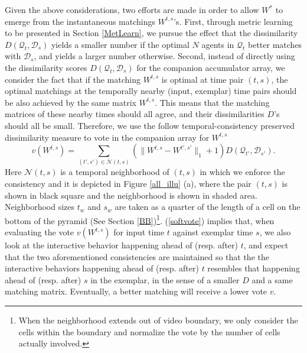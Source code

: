 Given the above considerations, two efforts are made in order to allow $W^{*}$ to emerge from the instantaneous matchings $W^{t,s}$'s. First, through metric learning to be presented in Section \ref{MetLearn}, we pursue the effect that the dissimilarity $D(\mathcal{Q}_{t}, \mathcal{D}_{s})$ yields a smaller number if the optimal $N$ agents in $\mathcal{Q}_{t}$ better matches with $\mathcal{D}_{s}$, and yields a larger number otherwise. Second, instead of directly using the dissimilarity scores $D(\mathcal{Q}_{t}, \mathcal{D}_{s})$ for the companion accumulator array, we consider the fact that if the matching $W^{t,s}$ is optimal at time pair $(t,s)$, the optimal matchings at the temporally nearby (input, exemplar) time pairs should be also achieved by the same matrix $W^{t,s}$. This means that the matching matrices of these nearby times should all agree, and their dissimilarities $D$'s should all be small. Therefore, we use the follow temporal-consistency preserved dissimilarity measure to vote in the companion array for $W^{t,s}$
\begin{equation}
\label{softvote}
v(W^{t,s})=\sum_{(t',s')\in\mathcal{N}(t,s)}(\|W^{t,s}-W^{t',s'}\|_{1}+1)D(\mathcal{Q}_{t'}, \mathcal{D}_{s'}).
\end{equation}
Here $\mathcal{N}(t,s)$ is a temporal neighborhood of $(t,s)$ in which we enforce the consistency and it is depicted in Figure \ref{all_illu} (a), where the pair $(t,s)$ is shown in black square and the neighborhood is shown in shaded area. Neighborhood sizes $t_{w}$ and $s_{w}$ are taken as a quarter of the length of a cell on the bottom of the pyramid (See Section \ref{BB})\footnote{When the neighborhood extends out of video boundary, we only consider the cells within the boundary and normalize the vote by the number of cells actually involved.}. (\ref{softvote}) implies that, when evaluating the vote $v(W^{t,s})$ for input time $t$ against exemplar time $s$, we also look at the interactive behavior happening ahead of (resp. after) $t$, and expect that the two aforementioned consistencies are maintained so that the the interactive behaviors happening ahead of (resp. after) $t$ resembles that happening ahead of (resp. after) $s$ in the exemplar, in the sense of a smaller $D$ and a same matching matrix. Eventually, a better matching will receive a lower vote $v$.

